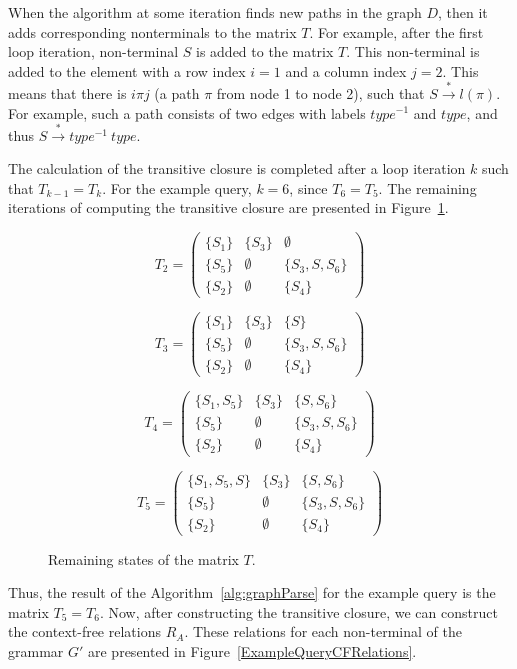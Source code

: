 When the algorithm at some iteration finds new paths in the graph $D$, then it adds corresponding nonterminals to the matrix $T$. For example, after the first loop iteration, non-terminal $S$ is added to the matrix $T$. This non-terminal is added to the element with a row index $i = 1$ and a column index $j = 2$. This means that there is $i\pi j$ (a path $\pi$ from node 1 to node 2), such that $S \xrightarrow{*} l(\pi)$. For example, such a path consists of two edges with labels $type^{-1}$ and $type$, and thus $S \xrightarrow{*} type^{-1} \ type$.

The calculation of the transitive closure is completed after a loop iteration $k$ such that $T_{k-1} = T_k$. For the example query, $k = 6$, since $T_6 = T_5$. The remaining iterations of computing the transitive closure are presented in Figure~\ref{ExampleQueryFinalIterations}.

\begin{figure}[h]
\[
T_2 = \begin{pmatrix}
    \{S_1\} & \{S_3\} & \emptyset \\ \{S_5\} & \emptyset & \{S_3, S, S_6\} \\ \{S_2\} & \emptyset & \{S_4\}
\end{pmatrix}
\]

\[
T_3 = \begin{pmatrix}
    \{S_1\} & \{S_3\} & \{S\} \\ \{S_5\} & \emptyset & \{S_3, S, S_6\} \\ \{S_2\} & \emptyset & \{S_4\}
\end{pmatrix}
\]

\[
T_4 = \begin{pmatrix}
    \{S_1, S_5\} & \{S_3\} & \{S, S_6\} \\ \{S_5\} & \emptyset & \{S_3, S, S_6\} \\ \{S_2\} & \emptyset & \{S_4\}
\end{pmatrix}
\]

\[
T_5 = \begin{pmatrix}
    \{S_1, S_5, S\} & \{S_3\} & \{S, S_6\} \\ \{S_5\} & \emptyset & \{S_3, S, S_6\} \\ \{S_2\} & \emptyset & \{S_4\}
\end{pmatrix}
\]
\caption{Remaining states of the matrix $T$.}
\label{ExampleQueryFinalIterations}
\end{figure}

Thus, the result of the Algorithm~\ref{alg:graphParse} for the example query is the matrix $T_5 = T_6$. Now, after constructing the transitive closure, we can construct the context-free relations $R_A$. These relations for each non-terminal of the grammar $G'$ are presented in Figure~\ref{ExampleQueryCFRelations}.

